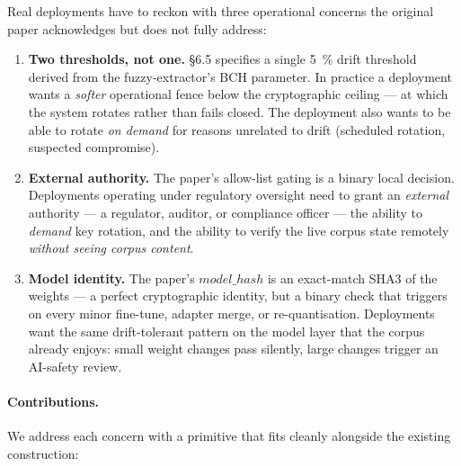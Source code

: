 \documentclass[11pt,a4paper]{article}
\begin{document}
Real deployments have to reckon with three operational concerns the
original paper acknowledges but does not fully address:

\begin{enumerate}
  \item \textbf{Two thresholds, not one.}  §6.5 specifies a single
        \SI{5}{\percent} drift threshold derived from the
        fuzzy\nobreakdash-extractor's BCH parameter.  In practice a
        deployment wants a \emph{softer} operational fence below the
        cryptographic ceiling — at which the system rotates rather
        than fails closed.  The deployment also wants to be able to
        rotate \emph{on demand} for reasons unrelated to drift
        (scheduled rotation, suspected compromise).
  \item \textbf{External authority.}  The paper's allow\nobreakdash-list
        gating is a binary local decision.  Deployments operating
        under regulatory oversight need to grant an \emph{external}
        authority — a regulator, auditor, or compliance officer —
        the ability to \emph{demand} key rotation, and the ability
        to verify the live corpus state remotely \emph{without
        seeing corpus content}.
  \item \textbf{Model identity.}  The paper's
        $\mathit{model\_hash}$ is an exact\nobreakdash-match
        SHA3 of the weights — a perfect cryptographic
        identity, but a binary check that triggers on every minor
        fine\nobreakdash-tune, adapter merge, or re\nobreakdash-quantisation.
        Deployments want the same drift\nobreakdash-tolerant pattern
        on the model layer that the corpus already enjoys: small
        weight changes pass silently, large changes trigger an
        AI\nobreakdash-safety review.
\end{enumerate}

\paragraph{Contributions.}  We address each concern with a primitive
that fits cleanly alongside the existing construction:
\end{document}

